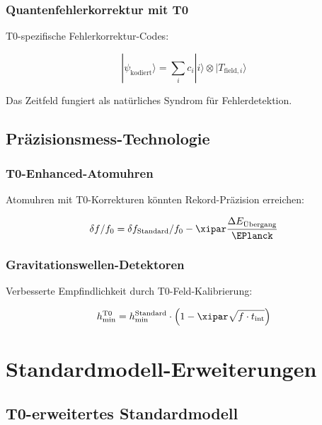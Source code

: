 	\subsubsection{Quantenfehlerkorrektur mit T0}
	
	T0-spezifische Fehlerkorrektur-Codes:
	
	\begin{equation}
		|\psi_{\text{kodiert}}\rangle = \sum_i c_i |i\rangle \otimes |T_{\text{field},i}\rangle
	\end{equation}
	
	Das Zeitfeld fungiert als natürliches Syndrom für Fehlerdetektion.
	
	\subsection{Präzisionsmess-Technologie}
	
	\subsubsection{T0-Enhanced-Atomuhren}
	
	Atomuhren mit T0-Korrekturen könnten Rekord-Präzision erreichen:
	
	\begin{equation}
		\delta f / f_0 = \delta f_{\text{Standard}} / f_0 - \xipar \frac{\Delta E_{\text{Übergang}}}{\EPlanck}
	\end{equation}
	
	\subsubsection{Gravitationswellen-Detektoren}
	
	Verbesserte Empfindlichkeit durch T0-Feld-Kalibrierung:
	
	\begin{equation}
		h_{\text{min}}^{\text{T0}} = h_{\text{min}}^{\text{Standard}} \cdot \left(1 - \xipar \sqrt{f \cdot t_{\text{int}}}\right)
	\end{equation}
	
	\section{Standardmodell-Erweiterungen}
	
	\subsection{T0-erweitertes Standardmodell}
	
